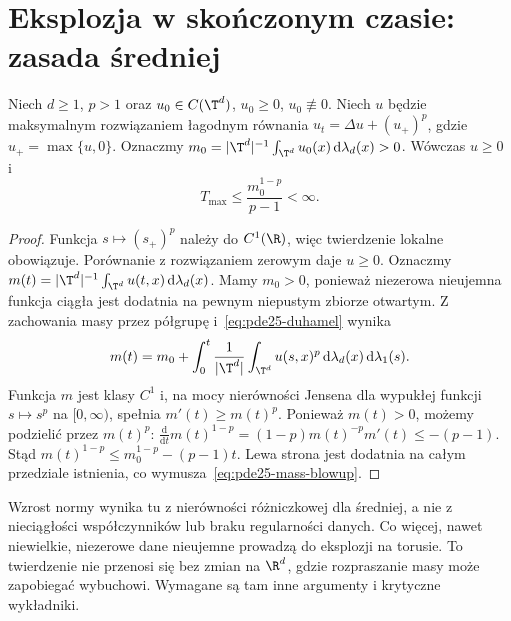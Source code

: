 \section{Eksplozja w skończonym czasie: zasada średniej}
\begin{twierdzenie}
\label{thm:pde25-blowup}
Niech $d\ge1$, $p>1$ oraz
$u_0\in C(\T^d)$, $u_0\ge0$, $u_0\not\equiv0$.
Niech $u$ będzie maksymalnym rozwiązaniem łagodnym
równania $u_t=\Delta u+(u_+)^p$, gdzie $u_+=\max\{u,0\}$.
Oznaczmy $m_0=|\T^d|^{-1}\int_{\T^d}u_0(x)
\,\mathrm d\lambda_d(x)>0$. Wówczas $u\ge0$ i
\begin{equation}\label{eq:pde25-mass-blowup}
 T_{\max}\le\frac{m_0^{1-p}}{p-1}<\infty.
\end{equation}
\end{twierdzenie}
\begin{proof}
Funkcja $s\mapsto(s_+)^p$ należy do $C^1(\R)$,
więc twierdzenie lokalne obowiązuje. Porównanie z
rozwiązaniem zerowym daje $u\ge0$. Oznaczmy
$m(t)=|\T^d|^{-1}\int_{\T^d}u(t,x)\,\mathrm d\lambda_d(x)$.
Mamy $m_0>0$, ponieważ niezerowa nieujemna funkcja
ciągła jest dodatnia na pewnym niepustym zbiorze otwartym.
Z zachowania masy przez półgrupę i~\eqref{eq:pde25-duhamel} wynika
\[
 m(t)=m_0+\int_0^t
 \frac1{|\T^d|}\int_{\T^d}u(s,x)^p\,
 \mathrm d\lambda_d(x)\,\mathrm d\lambda_1(s).
\]
Funkcja $m$ jest klasy $C^1$ i, na mocy nierówności
Jensena dla wypukłej funkcji $s\mapsto s^p$ na
$[0,\infty)$, spełnia $m'(t)\ge m(t)^p$.
Ponieważ $m(t)>0$, możemy podzielić przez $m(t)^p$:
$\frac{\mathrm d}{\mathrm dt}m(t)^{1-p}
=(1-p)m(t)^{-p}m'(t)\le-(p-1)$.
Stąd $m(t)^{1-p}\le m_0^{1-p}-(p-1)t$.
Lewa strona jest dodatnia na całym przedziale istnienia,
co wymusza~\eqref{eq:pde25-mass-blowup}.
\end{proof}

\begin{uwaga}
Wzrost normy wynika tu z nierówności różniczkowej dla
średniej, a nie z nieciągłości współczynników lub
braku regularności danych. Co więcej, nawet niewielkie,
niezerowe dane nieujemne prowadzą do eksplozji na torusie.
To twierdzenie nie przenosi się bez zmian na $\R^d$,
gdzie rozpraszanie masy może zapobiegać wybuchowi.
Wymagane są tam inne argumenty i krytyczne wykładniki.
\end{uwaga}


